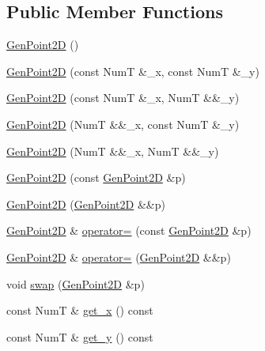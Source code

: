 \subsection*{Public Member Functions}
\begin{DoxyCompactItemize}
\item 
\hyperlink{class_designar_1_1_gen_point2_d_aa55395ebde205564d3065dc6ce56c42b}{Gen\+Point2D} ()
\item 
\hyperlink{class_designar_1_1_gen_point2_d_adf5298d432b48187deef32941429a1b3}{Gen\+Point2D} (const NumT \&\+\_\+x, const NumT \&\+\_\+y)
\item 
\hyperlink{class_designar_1_1_gen_point2_d_a7e3357422dc01310240f58fed213162d}{Gen\+Point2D} (const NumT \&\+\_\+x, NumT \&\&\+\_\+y)
\item 
\hyperlink{class_designar_1_1_gen_point2_d_ab4e177989279ac6e6f7280644f487cdd}{Gen\+Point2D} (NumT \&\&\+\_\+x, const NumT \&\+\_\+y)
\item 
\hyperlink{class_designar_1_1_gen_point2_d_a420eb654ce7cbb0a9f179c20db4e7c98}{Gen\+Point2D} (NumT \&\&\+\_\+x, NumT \&\&\+\_\+y)
\item 
\hyperlink{class_designar_1_1_gen_point2_d_abb677c76a6cfb8261f562250a15ca879}{Gen\+Point2D} (const \hyperlink{class_designar_1_1_gen_point2_d}{Gen\+Point2D} \&p)
\item 
\hyperlink{class_designar_1_1_gen_point2_d_a025c72ba6681c75f131066d1a5fc5e72}{Gen\+Point2D} (\hyperlink{class_designar_1_1_gen_point2_d}{Gen\+Point2D} \&\&p)
\item 
\hyperlink{class_designar_1_1_gen_point2_d}{Gen\+Point2D} \& \hyperlink{class_designar_1_1_gen_point2_d_a5561fbdf0a23f90f9f3c1fdce25c2f3a}{operator=} (const \hyperlink{class_designar_1_1_gen_point2_d}{Gen\+Point2D} \&p)
\item 
\hyperlink{class_designar_1_1_gen_point2_d}{Gen\+Point2D} \& \hyperlink{class_designar_1_1_gen_point2_d_a83a1f3723cbcdf6fa556e864269a63f6}{operator=} (\hyperlink{class_designar_1_1_gen_point2_d}{Gen\+Point2D} \&\&p)
\item 
void \hyperlink{class_designar_1_1_gen_point2_d_a1068ce1c6fbaa5c448044529ec3659e0}{swap} (\hyperlink{class_designar_1_1_gen_point2_d}{Gen\+Point2D} \&p)
\item 
const NumT \& \hyperlink{class_designar_1_1_gen_point2_d_a5b30afaea1584891bdbe00b72440374b}{get\+\_\+x} () const
\item 
const NumT \& \hyperlink{class_designar_1_1_gen_point2_d_ac8aa7a258e736f715b1e164206316f79}{get\+\_\+y} () const
\item 

\end{DoxyCompactItemize}
